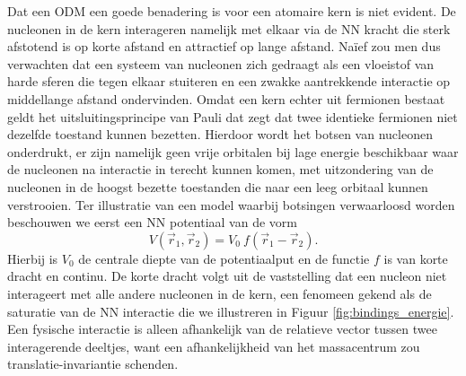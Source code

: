 \documentclass[11pt,twoside]{book}
\begin{document}
Dat een ODM een goede benadering is voor een atomaire kern is niet evident. De nucleonen in de kern interageren namelijk met elkaar via de NN kracht die sterk afstotend is op korte afstand en attractief op lange afstand. Na\"{i}ef zou men dus verwachten dat een systeem van nucleonen zich gedraagt als een vloeistof van harde sferen die tegen elkaar stuiteren en een zwakke aantrekkende interactie op middellange afstand ondervinden. Omdat een kern echter uit fermionen bestaat geldt het uitsluitingsprincipe van Pauli dat zegt dat twee identieke fermionen niet dezelfde toestand kunnen bezetten. Hierdoor wordt het botsen van nucleonen onderdrukt, er zijn namelijk geen vrije orbitalen bij lage energie beschikbaar waar de nucleonen na interactie in terecht kunnen komen, met uitzondering van de nucleonen in de hoogst bezette toestanden die naar een leeg orbitaal kunnen verstrooien. Ter illustratie van een model waarbij botsingen verwaarloosd worden beschouwen we eerst een NN potentiaal van de vorm
\begin{equation}
V(\vec{r}_1, \vec{r}_2) = V_0 \  f(\vec{r}_1 - \vec{r}_2).
\end{equation}
Hierbij is $V_0$ de centrale diepte van de potentiaalput en de functie $f$ is van korte dracht en continu. De korte dracht volgt uit de vaststelling dat een nucleon niet interageert met alle andere nucleonen in de kern, een fenomeen gekend als de saturatie van de NN interactie die we illustreren in Figuur \ref{fig:bindings_energie}. Een fysische interactie is alleen afhankelijk van de relatieve vector tussen twee interagerende deeltjes, want een afhankelijkheid van het massacentrum zou translatie-invariantie schenden.
\end{document}

